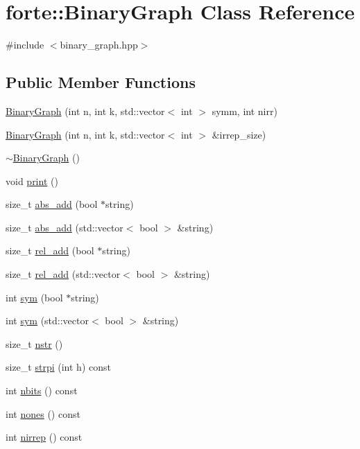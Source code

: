 \hypertarget{classforte_1_1_binary_graph}{}\section{forte\+:\+:Binary\+Graph Class Reference}
\label{classforte_1_1_binary_graph}


{\ttfamily \#include $<$binary\+\_\+graph.\+hpp$>$}

\subsection*{Public Member Functions}
\begin{DoxyCompactItemize}
\item 
\mbox{\hyperlink{classforte_1_1_binary_graph_a7db10825a6ba7e9c674ea2572e18f721}{Binary\+Graph}} (int n, int k, std\+::vector$<$ int $>$ symm, int nirr)
\item 
\mbox{\hyperlink{classforte_1_1_binary_graph_a2e5b37be3498a0510d728a06d13d3dbb}{Binary\+Graph}} (int n, int k, std\+::vector$<$ int $>$ \&irrep\+\_\+size)
\item 
\mbox{\hyperlink{classforte_1_1_binary_graph_ac61460299c2957fa129d32d5e6dcc2e6}{$\sim$\+Binary\+Graph}} ()
\item 
void \mbox{\hyperlink{classforte_1_1_binary_graph_a59aab8558674818bcca1cd6ebd0de449}{print}} ()
\item 
size\+\_\+t \mbox{\hyperlink{classforte_1_1_binary_graph_ad3345f97ada9b29ac2280bc4dd94ee9f}{abs\+\_\+add}} (bool $\ast$string)
\item 
size\+\_\+t \mbox{\hyperlink{classforte_1_1_binary_graph_adb079b21b25fa6fd79f5ac9880bb9776}{abs\+\_\+add}} (std\+::vector$<$ bool $>$ \&string)
\item 
size\+\_\+t \mbox{\hyperlink{classforte_1_1_binary_graph_adff860d95ab0b83339a85f74609fc19f}{rel\+\_\+add}} (bool $\ast$string)
\item 
size\+\_\+t \mbox{\hyperlink{classforte_1_1_binary_graph_afd54724890c20c1a6d88437ff8549e44}{rel\+\_\+add}} (std\+::vector$<$ bool $>$ \&string)
\item 
int \mbox{\hyperlink{classforte_1_1_binary_graph_ac9989eaceaf58b917d755fe6d503a4fb}{sym}} (bool $\ast$string)
\item 
int \mbox{\hyperlink{classforte_1_1_binary_graph_ab97305943561cf833f1871510af039b6}{sym}} (std\+::vector$<$ bool $>$ \&string)
\item 
size\+\_\+t \mbox{\hyperlink{classforte_1_1_binary_graph_a5256e8152eccc64ad285413f4e19abc8}{nstr}} ()
\item 
size\+\_\+t \mbox{\hyperlink{classforte_1_1_binary_graph_a9edd8d8b1fe41552192ca4105e5e21b5}{strpi}} (int h) const
\item 
int \mbox{\hyperlink{classforte_1_1_binary_graph_ae7015bad2f05753624d976b2e1b49726}{nbits}} () const
\item 
int \mbox{\hyperlink{classforte_1_1_binary_graph_aa9856a757d43525687f435f9e6f41859}{nones}} () const
\item 
int \mbox{\hyperlink{classforte_1_1_binary_graph_a8f432f2906a6b2ae1885527a2f934aa5}{nirrep}} () const
\end{DoxyCompactItemize}


